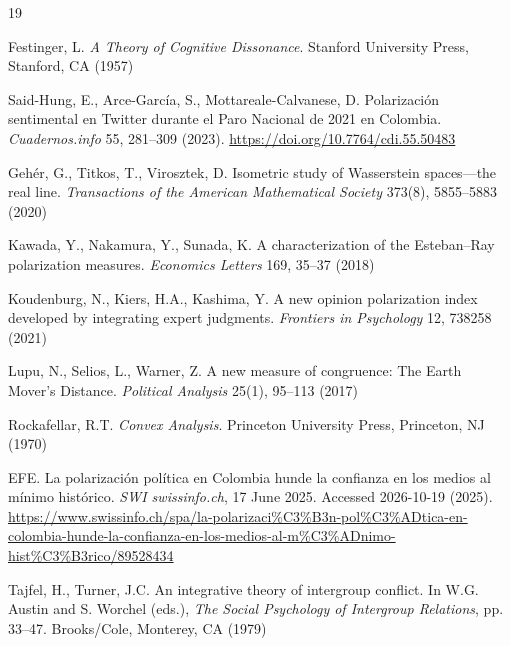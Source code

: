 \documentclass{article}
\theoremstyle{plain}
\theoremstyle{remark}
\begin{document}
\begin{thebibliography}{19}

Festinger, L.
\emph{A Theory of Cognitive Dissonance}.
Stanford University Press, Stanford, CA
(1957)


Said-Hung, E.,
Arce-García, S.,
Mottareale-Calvanese, D.
Polarización sentimental en Twitter durante el Paro Nacional de 2021 en Colombia.
\emph{Cuadernos.info}
55,
281--309
(2023).
\url{https://doi.org/10.7764/cdi.55.50483}


Geh\'{e}r, G.,
Titkos, T.,
Virosztek, D.
Isometric study of Wasserstein spaces---the real line.
\emph{Transactions of the American Mathematical Society}
373(8),
5855--5883
(2020)


Kawada, Y.,
Nakamura, Y.,
Sunada, K.
A characterization of the Esteban--Ray polarization measures.
\emph{Economics Letters}
169,
35--37
(2018)


Koudenburg, N.,
Kiers, H.A.,
Kashima, Y.
A new opinion polarization index developed by integrating expert
  judgments.
\emph{Frontiers in Psychology}
12,
738258
(2021)


Lupu, N.,
Selios, L.,
Warner, Z.
A new measure of congruence: The Earth Mover’s Distance.
\emph{Political Analysis}
25(1),
95--113
(2017)


Rockafellar, R.T.
\emph{Convex Analysis}.
Princeton University Press, Princeton, NJ
(1970)


EFE.
La polarización política en Colombia hunde la confianza en los medios al
  mínimo histórico.
\emph{SWI swissinfo.ch}, 17 June 2025. Accessed 2026-10-19
(2025).
\url{https://www.swissinfo.ch/spa/la-polarizaci%C3%B3n-pol%C3%ADtica-en-colombia-hunde-la-confianza-en-los-medios-al-m%C3%ADnimo-hist%C3%B3rico/89528434}


Tajfel, H.,
Turner, J.C.
An integrative theory of intergroup conflict.
In W.G. Austin and S. Worchel (eds.),
\emph{The Social Psychology of Intergroup Relations},
pp. 33--47.
Brooks/Cole, Monterey, CA
(1979)


\end{thebibliography}
\end{document}

